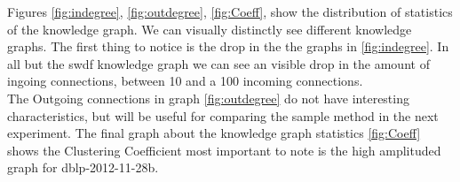\documentclass[11pt,letterpaper ,oneside ]{book}
\begin{document}
\begin{table}[!t]
	\centering
	\caption{table showing several statistics about graphs.}
	\label{table:GraphStats}
\end{table}

Figures \ref{fig:indegree},  \ref{fig:outdegree},  \ref{fig:Coeff}, show the distribution of statistics of the knowledge graph. We can visually distinctly see different knowledge graphs. The first thing to notice is the drop in the the graphs in \ref{fig:indegree}. In all but the swdf knowledge graph we can see an visible drop in the amount of ingoing connections, between 10 and a 100 incoming connections. \\
The Outgoing connections in graph \ref{fig:outdegree} do not have interesting characteristics, but will be useful for comparing the sample method in the next experiment. 
The final graph about the knowledge graph statistics \ref{fig:Coeff} shows the Clustering Coefficient most important to note is the high amplituded graph for dblp-2012-11-28b. \\
\end{document}

